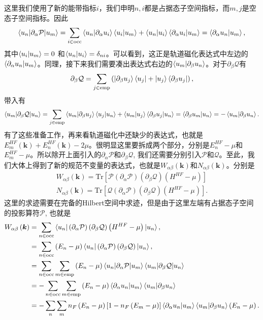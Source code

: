 \documentclass[10pt, oneside]{article}
\newcommand{\pa}{\partial}
\newcommand{\mr}[1]{\mathrm{#1}}
\newcommand{\p}[1]{\left(#1\right)}
\newcommand{\bb}[1]{\left[#1\right]}
\begin{document}
这里我们使用了新的能带指标\(i\)，我们申明\(n,i\)都是占据态子空间指标，而\(m,j\)是空态子空间指标。因此
\begin{align}
	\braket{u_n |\pa_{\alpha} \mathcal{P} | u_m} = \sum_{i \in \mr{occ}} \braket{u_n | \pa_{\alpha} u_i} \braket{u_i | u_m} + \braket{u_n | u_i} \braket{\pa_{\alpha} u_i | u_m} = \braket{\pa_{\alpha} u_n | u_m},
\end{align}
其中\(\braket{u_i | u_m} =0\) 和\(\braket{u_n | u_i} = \delta_{ni}\)。可以看到，这正是轨道磁化表达式中左边的\(\braket{\pa_{\alpha} u_n | u_m}\)。同理，接下来我们需要凑出表达式右边的\(\braket{u_m | \pa_{\beta} u_n}\)。对于\(\pa_{\beta} \mathcal{Q}\)有
\begin{align}
	\pa_{\beta} \mathcal{Q} = \sum_{j \in \mr{emp}} \p{\ket{\pa_{\beta} u_j} \bra{u_j} + \ket{u_j} \bra{\pa_{\beta} u_j}},
\end{align}
带入有
\begin{align}
	\braket{u_m | \pa_{\beta} \mathcal{Q} | u_n} = \sum_{j \in \mr{emp}} \braket{u_m | \pa_{\beta} u_j} \braket{u_j | u_n} + \braket{u_m | u_j} \braket{\pa_{\beta} u_j | u_n} = \braket{\pa_{\beta} u_m | u_n} = - \braket{u_m | \pa_{\beta} u_n}.
\end{align}
有了这些准备工作，再来看轨道磁化中还缺少的表达式，也就是\(E^{HF}_{m} \p{\bm{k}} + E^{HF}_{n} \p{\bm{k}} - 2 \mu\)。很明显这里要拆成两个部分，分别是\(E^{HF}_n - \mu\)和\(E^{HF}_m - \mu\)。所以除开上面引入的\(\pa_{\alpha} \mathcal{P}\)和\(\pa_{\beta} \mathcal{Q}\), 我们还需要分别引入\(\mathcal{P}\)和\(\mathcal{Q}\)。至此，我们大体上得到了新的规范不变量的表达式，也就是\(W_{\alpha \beta} \p{\bm{k}}\)和\(N_{\alpha \beta} \p{\bm{k}}\)。分别是
\begin{align}
	W_{\alpha \beta} \p{\bm{k}} = \mr{Tr} \bb{\mathcal{P} \p{\pa_{\alpha} \mathcal{P}} \p{\pa_{\beta} \mathcal{Q}} \p{H^{HF} - \mu }} \\
	N_{\alpha \beta} \p{\bm{k}} = \mr{Tr} \bb{\mathcal{Q} \p{\pa_{\alpha} \mathcal{P}} \p{\pa_{\beta} \mathcal{Q}} \p{H^{HF} - \mu }}.
\end{align}
这里的求迹需要在完备的Hilbert空间中求迹，但是由于这里左端有占据态子空间的投影算符\(\mathcal{P}\), 也就是
\begin{align}
	\begin{split}
		W_{\alpha \beta} \p{\bm{k}}  & = \sum_{n \in \mr{occ}} \braket{u_n | \p{\pa_{\alpha} \mathcal{P}} \p{\pa_{\beta} \mathcal{Q}} \p{H^{HF} - \mu} | u_n}, \\
		& = \sum_{n \in \mr{occ}} \p{E_n - \mu} \braket{u_n | \p{\pa_{\alpha} \mathcal{P}} \p{\pa_{\beta} \mathcal{Q}} | u_n}, \\
		& = \sum_{n \in \mr{occ}} \sum_{m \in \mr{emp}}\p{E_n - \mu} \braket{u_n |\pa_{\alpha} \mathcal{P} | u_m} \braket{u_{m} | \pa_{\beta} \mathcal{Q} | u_n}\\
		& = - \sum_{n \in \mr{occ}} \sum_{m \in \mr{emp}}\p{E_n - \mu} \braket{\pa_{\alpha} u_n | u_m} \braket{u_{m} | \pa_{\beta} u_n} \\
		& = - \sum_{n} \sum_{m} n_F \p{E_n - \mu} \bb{1 - n_F \p{E_m - \mu}} \braket{\pa_{\alpha} u_n | u_m} \braket{u_{m} | \pa_{\beta} u_n} \p{E_n - \mu}.
	\end{split}
\end{align}
\end{document}
